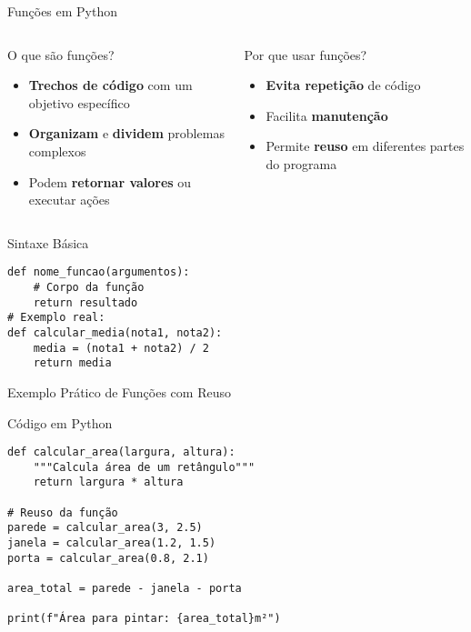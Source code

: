 \begin{frame}[fragile]{Funções em Python}


\begin{columns}
    \begin{block}{O que são funções?}
        \begin{itemize}
            \item \textbf{Trechos de código} com um objetivo específico
            \item \textbf{Organizam} e \textbf{dividem} problemas complexos
            \item Podem \textbf{retornar valores} ou executar ações
        \end{itemize}
    \end{block}
    
    \begin{alertblock}{Por que usar funções?}
        \begin{itemize}
            \item \textbf{Evita repetição} de código
            \item Facilita \textbf{manutenção}
            \item Permite \textbf{reuso} em diferentes partes do programa
        \end{itemize}
    \end{alertblock}
\end{columns}


\begin{exampleblock}{Sintaxe Básica}
\begin{verbatim}
def nome_funcao(argumentos):
    # Corpo da função
    return resultado
# Exemplo real:
def calcular_media(nota1, nota2):
    media = (nota1 + nota2) / 2
    return media
\end{verbatim}
\end{exampleblock}


\end{frame}

\begin{frame}[fragile]{Exemplo Prático de Funções com Reuso}



    \begin{block}{Código em Python}
\begin{verbatim}
def calcular_area(largura, altura):
    """Calcula área de um retângulo"""
    return largura * altura

# Reuso da função
parede = calcular_area(3, 2.5)
janela = calcular_area(1.2, 1.5)
porta = calcular_area(0.8, 2.1)

area_total = parede - janela - porta

print(f"Área para pintar: {area_total}m²")
\end{verbatim}
    \end{block}




\end{frame}

